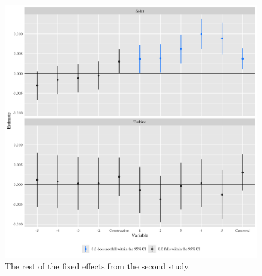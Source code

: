 \documentclass{article}
\begin{document}
\begin{figure}[h]
\centering
\includegraphics[width=0.9\linewidth]
{fixef_manipulation.png} 
\caption{The rest of the fixed effects from the second study.}
\label{fixef_manipulation}
\end{figure}
\end{document}
